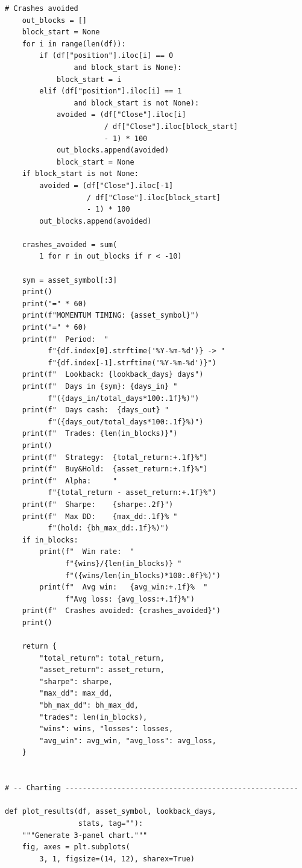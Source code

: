 \documentclass[11pt,a4paper]{article}
\begin{document}
\begin{codebox}
\begin{lstlisting}[style=python]
    # Crashes avoided
    out_blocks = []
    block_start = None
    for i in range(len(df)):
        if (df["position"].iloc[i] == 0
                and block_start is None):
            block_start = i
        elif (df["position"].iloc[i] == 1
                and block_start is not None):
            avoided = (df["Close"].iloc[i]
                       / df["Close"].iloc[block_start]
                       - 1) * 100
            out_blocks.append(avoided)
            block_start = None
    if block_start is not None:
        avoided = (df["Close"].iloc[-1]
                   / df["Close"].iloc[block_start]
                   - 1) * 100
        out_blocks.append(avoided)

    crashes_avoided = sum(
        1 for r in out_blocks if r < -10)

    sym = asset_symbol[:3]
    print()
    print("=" * 60)
    print(f"MOMENTUM TIMING: {asset_symbol}")
    print("=" * 60)
    print(f"  Period:  "
          f"{df.index[0].strftime('%Y-%m-%d')} -> "
          f"{df.index[-1].strftime('%Y-%m-%d')}")
    print(f"  Lookback: {lookback_days} days")
    print(f"  Days in {sym}: {days_in} "
          f"({days_in/total_days*100:.1f}%)")
    print(f"  Days cash:  {days_out} "
          f"({days_out/total_days*100:.1f}%)")
    print(f"  Trades: {len(in_blocks)}")
    print()
    print(f"  Strategy:  {total_return:+.1f}%")
    print(f"  Buy&Hold:  {asset_return:+.1f}%")
    print(f"  Alpha:     "
          f"{total_return - asset_return:+.1f}%")
    print(f"  Sharpe:    {sharpe:.2f}")
    print(f"  Max DD:    {max_dd:.1f}% "
          f"(hold: {bh_max_dd:.1f}%)")
    if in_blocks:
        print(f"  Win rate:  "
              f"{wins}/{len(in_blocks)} "
              f"({wins/len(in_blocks)*100:.0f}%)")
        print(f"  Avg win:   {avg_win:+.1f}%  "
              f"Avg loss: {avg_loss:+.1f}%")
    print(f"  Crashes avoided: {crashes_avoided}")
    print()

    return {
        "total_return": total_return,
        "asset_return": asset_return,
        "sharpe": sharpe,
        "max_dd": max_dd,
        "bh_max_dd": bh_max_dd,
        "trades": len(in_blocks),
        "wins": wins, "losses": losses,
        "avg_win": avg_win, "avg_loss": avg_loss,
    }


# -- Charting ------------------------------------------------------

def plot_results(df, asset_symbol, lookback_days,
                 stats, tag=""):
    """Generate 3-panel chart."""
    fig, axes = plt.subplots(
        3, 1, figsize=(14, 12), sharex=True)


\end{lstlisting}
\end{codebox}
\end{document}
